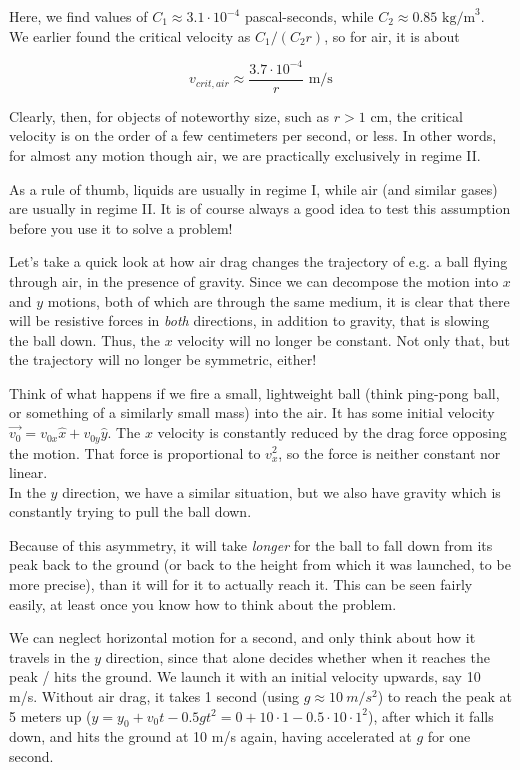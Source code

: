 Here, we find values of $C_1 \approx 3.1 \cdot 10^{-4}$ pascal-seconds, while $C_2 \approx 0.85 \text{ kg/m}^3$.\\
We earlier found the critical velocity as $C_1/(C_2 r)$, so for air, it is about 

\begin{equation}
v_{crit,air} \approx \frac{3.7 \cdot 10^{-4}}{r} \text{ m/s}
\end{equation}

Clearly, then, for objects of noteworthy size, such as $r > 1$ cm, the critical velocity is on the order of a few centimeters per second, or less. In other words, for almost any motion though air, we are practically exclusively in regime II.

As a rule of thumb, liquids are usually in regime I, while air (and similar gases) are usually in regime II. It is of course always a good idea to test this assumption before you use it to solve a problem!

Let's take a quick look at how air drag changes the trajectory of e.g. a ball flying through air, in the presence of gravity. Since we can decompose the motion into $x$ and $y$ motions, both of which are through the same medium, it is clear that there will be resistive forces in \emph{both} directions, in addition to gravity, that is slowing the ball down. Thus, the $x$ velocity will no longer be constant. Not only that, but the trajectory will no longer be symmetric, either!

Think of what happens if we fire a small, lightweight ball (think ping-pong ball, or something of a similarly small mass) into the air. It has some initial velocity $\vec{v_0} = v_{0x} \hat{x} + v_{0y} \hat{y}$. The $x$ velocity is constantly reduced by the drag force opposing the motion. That force is proportional to $v_x^2$, so the force is neither constant nor linear.\\
In the $y$ direction, we have a similar situation, but we also have gravity which is constantly trying to pull the ball down.

Because of this asymmetry, it will take \emph{longer} for the ball to fall down from its peak back to the ground (or back to the height from which it was launched, to be more precise), than it will for it to actually reach it. This can be seen fairly easily, at least once you know how to think about the problem.

We can neglect horizontal motion for a second, and only think about how it travels in the $y$ direction, since that alone decides whether when it reaches the peak / hits the ground. We launch it with an initial velocity upwards, say 10 m/s. Without air drag, it takes 1 second (using $g \approx \SI{10}{m/s^2}$) to reach the peak at 5 meters up ($y = y_0 + v_0t - 0.5 g t^2 = 0 + 10\cdot1 - 0.5\cdot10\cdot1^2$), after which it falls down, and hits the ground at 10 m/s again, having accelerated at $g$ for one second.

